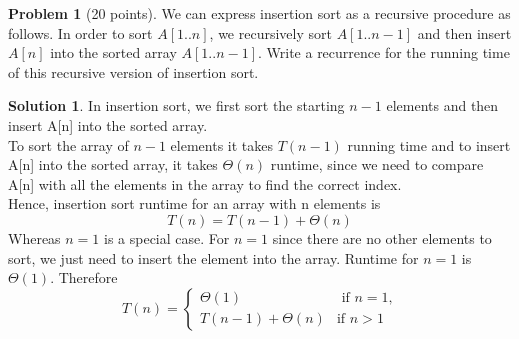 \documentclass{article}
\theoremstyle{definition}
\newtheorem{problem}{Problem}
\newtheorem*{solution}{Solution}
\begin{document}
\begin{problem}[20 points]
  We can express insertion sort as a recursive procedure as follows. 
In order to sort $A[1..n]$, we recursively sort $A[1..n-1]$ and then
insert $A[n]$ into the sorted array $A[1..n-1]$. Write a recurrence for
the running time of this recursive version of insertion sort. 
\end{problem}
\begin{solution}
In insertion sort, we first sort the starting $n-1$ elements and then insert A[n] into the sorted array.\\
To sort the array of $n-1$ elements it takes $T(n-1)$ running time and to insert A[n] into the sorted array, it takes $\Theta(n)$ runtime, since we need to compare A[n] with all the elements in the array to find the correct index. \\
Hence, insertion sort runtime for an array with n elements is 
$$T(n) = T(n-1) + \Theta(n)$$
Whereas $n = 1$ is a special case. For $n = 1$ since there are no other elements to sort, we just need to insert the element into the array. Runtime for $n = 1$ is $\Theta(1)$. Therefore
$$ T(n) = \begin{cases}
\Theta(1) & \text{ if $n=1$,} \\
T(n-1) + \Theta(n) & \text{if $n>1$}
\end{cases}
$$
\end{solution}
\end{document}
